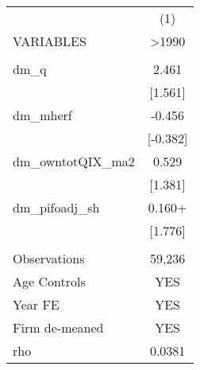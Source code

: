 \documentclass[]{article}
\begin{document}
\begin{tabular}{lc} \hline
 & (1) \\
VARIABLES & >1990 \\ \hline
 &  \\
dm\_q & 2.461 \\
 & [1.561] \\
dm\_mherf & -0.456 \\
 & [-0.382] \\
dm\_owntotQIX\_ma2 & 0.529 \\
 & [1.381] \\
dm\_pifoadj\_sh & 0.160+ \\
 & [1.776] \\
 &  \\
Observations & 59,236 \\
Age Controls & YES \\
Year FE & YES \\
Firm de-meaned & YES \\
 rho & 0.0381 \\ \hline
\end{tabular}
\end{document}
